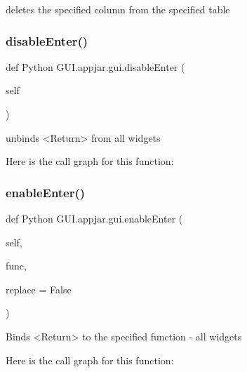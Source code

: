 \begin{DoxyVerb}deletes the specified column from the specified table \end{DoxyVerb}
 \mbox{\label{class_python_01_g_u_i_1_1appjar_1_1gui_a8c2ce3f29a430cd8ef1e1000491f5ac7}} 
\subsubsection{\texorpdfstring{disable\+Enter()}{disableEnter()}}
{\footnotesize\ttfamily def Python G\+U\+I.\+appjar.\+gui.\+disable\+Enter (\begin{DoxyParamCaption}\item[{}]{self }\end{DoxyParamCaption})}

\begin{DoxyVerb}unbinds <Return> from all widgets \end{DoxyVerb}
 Here is the call graph for this function\+:
\mbox{\label{class_python_01_g_u_i_1_1appjar_1_1gui_af2baccf9eff76e5af107a13e3f6720c2}} 
\subsubsection{\texorpdfstring{enable\+Enter()}{enableEnter()}}
{\footnotesize\ttfamily def Python G\+U\+I.\+appjar.\+gui.\+enable\+Enter (\begin{DoxyParamCaption}\item[{}]{self,  }\item[{}]{func,  }\item[{}]{replace = {\ttfamily False} }\end{DoxyParamCaption})}

\begin{DoxyVerb}Binds <Return> to the specified function - all widgets \end{DoxyVerb}
 Here is the call graph for this function\+:
\mbox{\label{class_python_01_g_u_i_1_1appjar_1_1gui_adb96d524b25591d68fc650525739641b}} 

